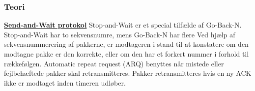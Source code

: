\subsubsection{Teori}
\underline{\textbf{Send-and-Wait protokol}}
\newline
Stop-and-Wait er et special tilfælde af Go-Back-N.
Stop-and-Wait har to sekvensnumre, mens Go-Back-N har flere
\newline
Ved hjælp af sekvensnummerering af pakkerne, er modtageren i stand til at konstatere om den modtagne pakke er den korrekte, eller om den har et forkert nummer i forhold til rækkefølgen.
\newline
Automatic repeat request (ARQ) benyttes når mistede eller fejlbehæftede pakker skal retransmitteres. Pakker retransmitteres hvis en ny ACK ikke er modtaget inden timeren udløber.
\newline

